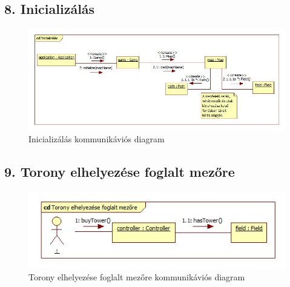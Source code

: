 \subsection{8. Inicializálás}
\begin{figure}[H]
\begin{center}
\includegraphics[width=17cm]{chapters/chapter05/images/cd_Inicializalas.jpg}
\caption{Inicializálás kommunikáviós diagram}
\label{fig:cd_Inicializalas}
\end{center}
\end{figure}

\subsection{9. Torony elhelyezése foglalt mezőre}
\begin{figure}[H]
\begin{center}
\includegraphics[width=17cm]{chapters/chapter05/images/cd_Torony_elhelyezese_foglalt_mezore.jpg}
\caption{Torony elhelyezése foglalt mezőre kommunikáviós diagram}
\label{fig:cd_Torony_elhelyezese_foglalt_mezore}
\end{center}
\end{figure}

